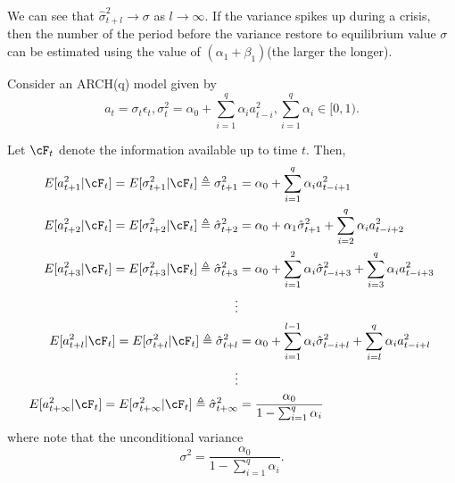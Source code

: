 \begin{remark}
	We can see that $\hat{\sigma}_{t+l}^2 \to \sigma$ as $l\to \infty$. If the variance spikes up during a crisis, then the number of the period before the variance restore to equilibrium value $\sigma$ can be estimated using the value of $(\alpha_1+\beta_1)$(the larger the longer).
\end{remark}

\begin{theorem}
	Consider an ARCH(q) model given by
	$$a_t = \sigma_t \epsilon_t, \sigma_t^2 = \alpha_0 + \sum_{i=1}^{q} \alpha_i a_{t-i}^2, \sum_{i=1}^{q}\alpha_i \in [0,1).$$
	
	Let $\cF_t$ denote the information available up to time $t$. Then,
	\begin{align*}
	E[a_{t+1}^2|\cF_t] = E[\sigma_{t+1}^2|\cF_t] \triangleq 
\sigma^2_{t+1} &= \alpha_0 + \sum_{i=1}^{q}\alpha_i a_{t-i+1}^2 \\ 
E[a_{t+2}^2|\cF_t] = E[\sigma_{t+2}^2|\cF_t]\triangleq \hat{\sigma}_{t+2}^2 
&=\alpha_0 + \alpha_1 \hat{\sigma}_{t+1}^2 + \sum_{i=2}^{q}\alpha_i a_{t-i+2}^2\\
E[a_{t+3}^2|\cF_t] = E[\sigma_{t+3}^2|\cF_t]\triangleq \hat{\sigma}_{t+3}^2 &= \alpha_0 + \sum_{i=1}^{2}\alpha_i \hat{\sigma}_{t-i+3}^2 + \sum_{i=3}^{q}\alpha_i a_{t-i+3}^2\\
\vdots & \\
E[a_{t+l}^2|\cF_t] = E[\sigma_{t+l}^2|\cF_t]\triangleq\hat{\sigma}_{t+l}^2 &= \alpha_0 + \sum_{i=1}^{l-1}\alpha_i \hat{\sigma}_{t-i+l}^2 + \sum_{i=l}^{q}\alpha_i a_{t-i+l}^2\\
\vdots & \\
E[a_{t+\infty}^2|\cF_t] = E[\sigma_{t+\infty}^2|\cF_t]\triangleq \hat{\sigma}_{t+\infty}^2 &= \frac{\alpha_0}{1 - \sum_{i=1}^{q}\alpha_i} 
	\end{align*}
	where note that the unconditional variance $$\sigma^2 = \frac{\alpha_0}{1 - \sum_{i=1}^{q}\alpha_i}.$$	
\end{theorem}
